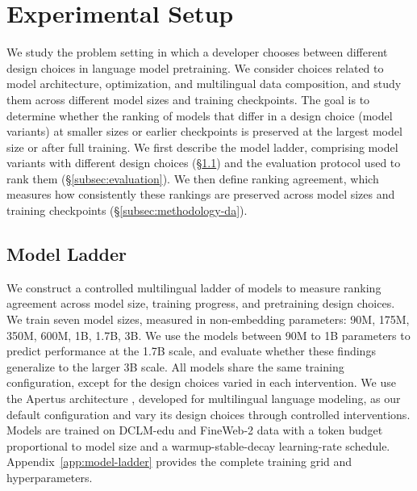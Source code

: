 \section{Experimental Setup}
\label{sec:methodology}
We study the problem setting in which a developer chooses between different design choices in language model pretraining.
We consider choices related to model architecture, optimization, and multilingual data composition, and study them across different model sizes and training checkpoints.
The goal is to determine whether the ranking of models that differ in a design choice (model variants) at smaller sizes or earlier checkpoints is preserved at the largest model size or after full training.
We first describe the model ladder, comprising model variants with different design choices (\S\ref{subsec:models}) and the evaluation protocol used to rank them (\S\ref{subsec:evaluation}). We then define ranking agreement, which measures how consistently these rankings are preserved across model sizes and training checkpoints (\S\ref{subsec:methodology-da}).

\subsection{Model Ladder}
\label{subsec:models}

We construct a controlled multilingual ladder of \nmodels models to measure ranking agreement across model size, training progress, and pretraining design choices.
We train seven model sizes, measured in non-embedding parameters: 90M, 175M, 350M, 600M, 1B, 1.7B, 3B. We use the models between 90M to 1B parameters to predict performance at the 1.7B scale, and evaluate whether these findings generalize to the larger 3B scale.
All models share the same training configuration, except for the design choices varied in each intervention.
We use the Apertus architecture \citep{apertus_apertus_2025}, developed for multilingual language modeling, as our default configuration and vary its design choices through controlled interventions. 
Models are trained on DCLM-edu and FineWeb-2 data with a token budget proportional to model size and a warmup-stable-decay learning-rate schedule.
Appendix~\ref{app:model-ladder} provides the complete training grid and hyperparameters.


